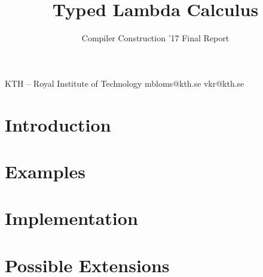 \documentclass[nocopyrightspace,11pt,authoryear,preprint]{sigplanconf}
\begin{document}


\title{Typed Lambda Calculus}
\subtitle{Compiler Construction '17 Final Report}

           {KTH -- Royal Institute of Technology}
           {mbloms@kth.se vkr@kth.se}

\maketitle

\section{Introduction}


\section{Examples}


\section{Implementation}


\section{Possible Extensions}




\end{document}
